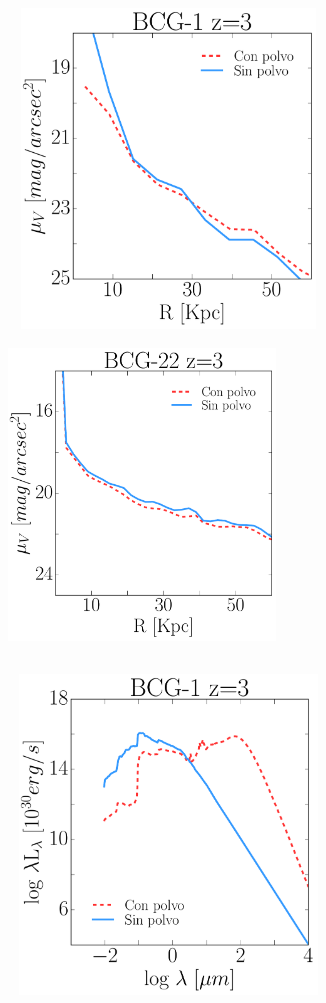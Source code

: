 \begin{figure}[H]
 \includegraphics[height=8.5cm, width=8.5cm,trim={0cm 0.1cm 0.cm 0.cm},clip]{../al_final/LR/LR_minpot3_rmmax/polvo_nopolvo1b3.pdf}
 \includegraphics[height=8.5cm, width=7.1cm,trim={2.9cm 0.1cm 0.2cm 0.cm},clip]{../al_final/LR/LR_minpot3_rmmax/polvo_nopolvo1D22.pdf}
\end{figure}


\begin{figure}[H]
\centering
 \includegraphics[height=8.5cm, width=8.5cm,trim={0cm 0.1cm 0.cm 0.cm},clip]{../al_final/plots/seds/plots_seds/sed_D1.pdf}
\end{figure}


